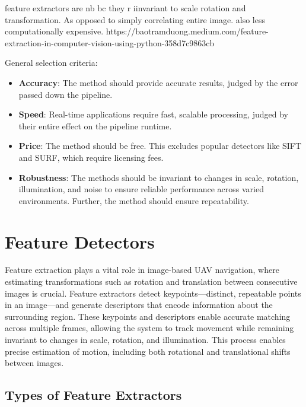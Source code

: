 

feature extractors are nb bc they r iinvariant to scale rotation and transformation. As opposed to simply correlating entire image. also less computationally expensive.
https://baotramduong.medium.com/feature-extraction-in-computer-vision-using-python-358d7c9863cb




General selection criteria:

\begin{itemize}
    \item \textbf{Accuracy}: The method should provide accurate results, judged by the error passed down the pipeline. 
    \item \textbf{Speed}: Real-time applications require fast, scalable processing, judged by their entire effect on the pipeline runtime.
    \item \textbf{Price}: The method should be free. This excludes popular detectors like SIFT and SURF, which require licensing fees.
    \item \textbf{Robustness}: The methods should be invariant to changes in scale, rotation, illumination, and noise to ensure reliable performance across varied environments. Further, the method should ensure repeatability. 
\end{itemize}





\section*{Feature Detectors} 



Feature extraction plays a vital role in image-based UAV navigation, where estimating transformations such as rotation and translation between consecutive images is crucial. Feature extractors detect keypoints—distinct, repeatable points in an image—and generate descriptors that encode information about the surrounding region. These keypoints and descriptors enable accurate matching across multiple frames, allowing the system to track movement while remaining invariant to changes in scale, rotation, and illumination. This process enables precise estimation of motion, including both rotational and translational shifts between images.


\subsection*{Types of Feature Extractors}

